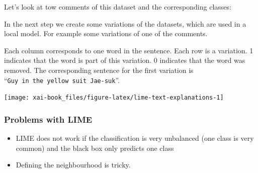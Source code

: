 \documentclass[12pt,]{krantz}
\providecommand{\tightlist}{%
  \setlength{\itemsep}{0pt}\setlength{\parskip}{0pt}}
\theoremstyle{definition}
\theoremstyle{definition}
\theoremstyle{definition}
\theoremstyle{remark}
\begin{document}
Let's look at tow comments of this dataset and the corresponding
classes:

\hypertarget{htmlwidget-a7e2e3f97b18ee50788e}{}

In the next step we create some variations of the datasets, which are
used in a local model. For example some variations of one of the
comments.

\hypertarget{htmlwidget-d2a25d7a243dd7d0fdba}{}

Each column corresponds to one word in the sentence. Each row is a
variation. 1 indicates that the word is part of this variation. 0
indicates that the word was removed. The corresponding sentence for the
first variation is ``\texttt{Guy\ in\ the\ yellow\ suit\ Jae-suk}''.

\begin{center}\texttt{[image: xai-book\_files/figure-latex/lime-text-explanations-1]} \end{center}

\subsubsection{Problems with LIME}\label{problems-with-lime}

\begin{itemize}
\tightlist
\item
  LIME does not work if the classification is very unbalanced (one class
  is very common) and the black box only predicts one class
\item
  Defining the neighbourhood is tricky.
\end{itemize}



\backmatter
\end{document}
